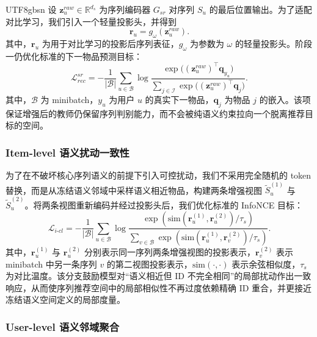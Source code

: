 \documentclass{article}
\begin{document}
\begin{CJK*}{UTF8}{gbsn}
设 $\mathbf{z}_u^{raw}\in\mathbb{R}^{d_s}$ 为序列编码器 $G_{sr}$ 对序列 $S_u$ 的最后位置输出。为了适配对比学习，我们引入一个轻量投影头，并得到
\begin{equation}
\mathbf{r}_u=g_{\omega}(\mathbf{z}_u^{raw}).
\end{equation}
其中，$\mathbf{r}_u$ 为用于对比学习的投影后序列表征，$g_{\omega}$ 为参数为 $\omega$ 的轻量投影头。阶段一仍优化标准的下一物品预测目标：
\begin{equation}
\mathcal{L}_{rec}^{sr}
=-\frac{1}{|\mathcal{B}|}\sum_{u\in\mathcal{B}}
\log
\frac{\exp\big((\mathbf{z}_u^{raw})^\top \mathbf{q}_{y_u}\big)}
{\sum_{j\in\mathcal I}\exp\big((\mathbf{z}_u^{raw})^\top \mathbf{q}_{j}\big)}.
\end{equation}
其中，$\mathcal{B}$ 为 minibatch，$y_u$ 为用户 $u$ 的真实下一物品，$\mathbf{q}_j$ 为物品 $j$ 的嵌入。该项保证增强后的教师仍保留序列判别能力，而不会被纯语义约束拉向一个脱离推荐目标的空间。

\subsubsection{Item-level 语义扰动一致性}

为了在不破坏核心序列语义的前提下引入可控扰动，我们不采用完全随机的 token 替换，而是从冻结语义邻域中采样语义相近物品，构建两条增强视图 $\tilde{S}_u^{(1)}$ 与 $\tilde{S}_u^{(2)}$。将两条视图重新编码并经过投影头后，我们优化标准的 InfoNCE 目标：
\begin{equation}
\mathcal{L}_{i\text{-}cl}
=-\frac{1}{|\mathcal{B}|}\sum_{u\in\mathcal{B}}
\log
\frac{\exp(\mathrm{sim}(\mathbf{r}_u^{(1)},\mathbf{r}_u^{(2)})/\tau_s)}
{\sum_{v\in\mathcal{B}}
\exp(\mathrm{sim}(\mathbf{r}_u^{(1)},\mathbf{r}_v^{(2)})/\tau_s)}.
\end{equation}
其中，$\mathbf{r}_u^{(1)}$ 与 $\mathbf{r}_u^{(2)}$ 分别表示同一序列两条增强视图的投影表示，$\mathbf{r}_v^{(2)}$ 表示 minibatch 中另一条序列 $v$ 的第二视图投影表示，$\mathrm{sim}(\cdot,\cdot)$ 表示余弦相似度，$\tau_s$ 为对比温度。该分支鼓励模型对“语义相近但 ID 不完全相同”的局部扰动作出一致响应，从而使序列推荐空间中的局部相似性不再过度依赖精确 ID 重合，并更接近冻结语义空间定义的局部度量。

\subsubsection{User-level 语义邻域聚合}


\end{CJK*}
\end{document}
